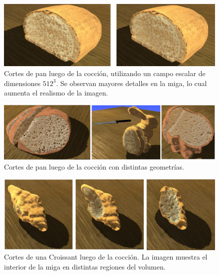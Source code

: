 \documentclass[spanish,a4paper,openright,11pt]{book}
\begin{document}
\begin{figure}[!ht]
\begin{center}
\includegraphics[width=15cm]{figures/otherbread512}
\caption{Cortes de pan luego de la cocción, utilizando un campo escalar de dimensiones $512^{3}$. Se observan mayores detalles en la miga, lo cual aumenta el realismo de la imagen.}
\label{fg:renders2}
\end{center}
\end{figure}

\begin{figure}[!ht]
\begin{center}
\includegraphics[width=15cm]{figures/final}
\caption{Cortes de pan luego de la cocción con distintas geometrías.}
\label{fg:renders3}
\end{center}
\end{figure}

\begin{figure}[!ht]
\begin{center}
\includegraphics[width=15cm]{figures/croissant}
\caption{Cortes de una Croissant luego de la cocción. La imagen muestra el interior de la miga en distintas regiones del volumen.}
\label{fg:croissant}
\end{center}
\end{figure}
\end{document}
